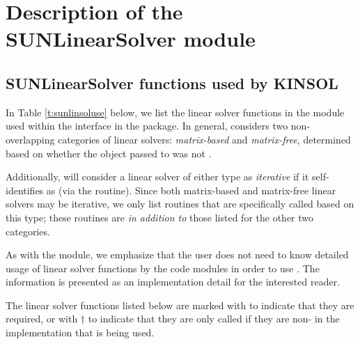 \chapter{Description of the SUNLinearSolver module}\label{s:sunlinsol}



\section{SUNLinearSolver functions used by KINSOL}

In Table \ref{t:sunlinsoluse} below, we list the linear solver
functions in the {\sunlinsol} module used within the {\kinls}
interface in the {\kinsol} package.  In general, {\kinls} considers two
non-overlapping categories of linear solvers: \emph{matrix-based} and
\emph{matrix-free}, determined based on whether the {\sunmatrix}
object  passed to  was not .

Additionally, {\kinls} will consider a linear solver of either type as
\emph{iterative} if it self-identifies as
 (via the 
routine).  Since both matrix-based and matrix-free linear solvers may
be iterative, we only list {\sunlinsol} routines that are specifically
called based on this type; these routines are \emph{in addition to} those
listed for the other two categories.

As with the {\sunmatrix} module, we emphasize that the {\kinsol} user
does not need to know detailed usage of linear solver functions by the
{\kinsol} code modules in order to use {\kinsol}. The information is
presented as an implementation detail for the interested reader.

The linear solver functions listed below are marked with \cm to
indicate that they are required, or with $\dagger$ to indicate that
they are only called if they are non- in the {\sunlinsol}
implementation that is being used.  

